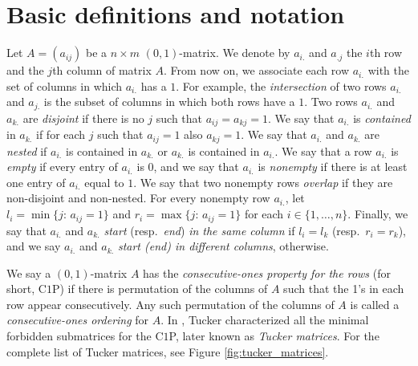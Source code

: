 \documentclass[12pt]{book}
\theoremstyle{plain}
\theoremstyle{remark}
\begin{document}
\section{Basic definitions and notation} \label{section:basic_defs}

Let $A=(a_{ij})$ be a $n\times m$ $(0,1)$-matrix.
We denote by $a_{i.}$ and $a_{.j}$ the $i$th row and the $j$th column of matrix $A$. From now on, we associate each row $a_{i.}$ with the set of columns in which $a_{i.}$ has a $1$. For example, the \emph{intersection} of two rows $a_{i.}$ and $a_{j.}$ is the subset of columns in which both rows have a $1$.
Two rows $a_{i.}$ and $a_{k.}$ are \emph{disjoint} if there is no $j$ such that $a_{ij} = a_{kj} = 1$.
We say that $a_{i.}$ is \emph{contained} in $a_{k.}$ if for each $j$ such that $a_{ij} = 1$ also $a_{kj} = 1$. We say that $a_{i.}$ and $a_{k.}$ are \emph{nested} if $a_{i.}$ is contained in $a_{k.}$ or $a_{k.}$ is contained in $a_{i.}$.
We say that a row $a_{i.}$ is \emph{empty} if every entry of $a_{i.}$ is $0$, and we say that $a_{i.}$ is \emph{nonempty} if there is at least one entry of $a_{i.}$ equal to $1$.
We say that two nonempty rows \emph{overlap} if they are non-disjoint and non-nested.
For every nonempty row $a_{i.}$, let $l_i = \min\{ j \colon\,a_{ij} = 1 \}$ and $r_i = \max\{ j \colon\,a_{ij} = 1 \}$ for each $i\in\{1,\ldots,n\}$.
Finally, we say that $a_{i.}$ and $a_{k.}$ \emph{start} (resp.\ \emph{end}) \emph{in the same column} if $l_i = l_k$ (resp.\ $r_i = r_k$), and we say $a_{i.}$ and $a_{k.}$ \emph{start (end) in different columns}, otherwise.

We say a $(0,1)$-matrix $A$ has the \emph{consecutive-ones property for the rows }(for short, C$1$P) if there is permutation of the columns of $A$ such that the 1's in each row appear con\-sec\-u\-tive\-ly. Any such permutation of the columns of $A$ is called a \emph{consecutive-ones ordering }for $A$.
In \cite{T72}, Tucker characterized all the minimal forbidden submatrices for the C$1$P, later known as \emph{Tucker matrices}. For the complete list of Tucker matrices, see Figure \ref{fig:tucker_matrices}.
 
\end{document}
